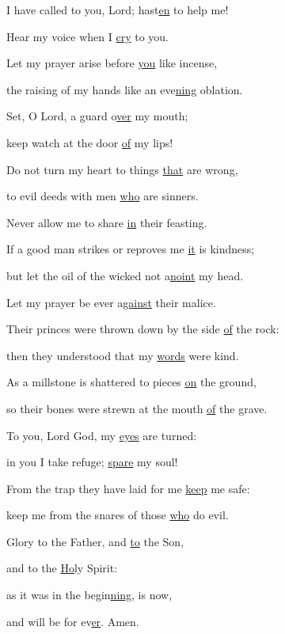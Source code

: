 \noindent I have called to you, Lord; hast\uline{en} to help me!~\GreStar{}~\nopagebreak

Hear my voice when I \uline{cry} to you.

\noindent Let my prayer arise before \uline{you} like incense,~\GreStar{}~\nopagebreak

the raising of my hands like an eve\uline{ning} oblation.

\noindent Set, O Lord, a guard o\uline{ver} my mouth;~\GreStar{}~\nopagebreak

keep watch at the door \uline{of} my lips!

\noindent Do not turn my heart to things \uline{that} are wrong,~\GreStar{}~\nopagebreak

to evil deeds with men \uline{who} are sinners.

\noindent Never allow me to share \uline{in} their feasting.~\GreStar{}~\nopagebreak

If a good man strikes or reproves me \uline{it} is kindness;

\noindent but let the oil of the wicked not a\uline{noint} my head.~\GreStar{}~\nopagebreak

Let my prayer be ever a\uline{gainst} their malice.

\noindent Their princes were thrown down by the side \uline{of} the rock:~\GreStar{}~\nopagebreak

then they understood that my \uline{words} were kind.

\noindent As a millstone is shattered to pieces \uline{on} the ground,~\GreStar{}~\nopagebreak

so their bones were strewn at the mouth \uline{of} the grave.

\noindent To you, Lord God, my \uline{eyes} are turned:~\GreStar{}~\nopagebreak

in you I take refuge; \uline{spare} my soul!

\noindent From the trap they have laid for me \uline{keep} me safe:~\GreStar{}~\nopagebreak

keep me from the snares of those \uline{who} do evil.

\noindent Glory to the Father, and \uline{to} the Son,~\GreStar{}~\nopagebreak

and to the \uline{Ho}ly Spirit:

\noindent as it was in the begin\uline{ning}, is now,~\GreStar{}~\nopagebreak

and will be for ev\uline{er}. Amen.

